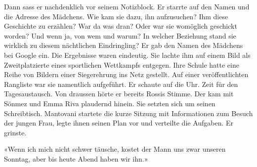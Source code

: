 Dann sass er nachdenklich vor seinem Notizblock. Er starrte auf den Namen
und die Adresse des Mädchens. 
Wie kam sie dazu, ihn aufzusuchen? Ihm diese Geschichte zu
erzählen? War da was dran? Oder war sie womöglich geschickt worden? Und
wenn ja, von wem und warum? In welcher Beziehung stand sie wirklich zu
diesem nächtlichen Eindringling? Er gab den Namen des Mädchens bei
Google ein. Die Ergebnisse waren eindeutig. Sie lachte ihm auf einem
Bild als Zweitplatzierte eines sportlichen Wettkampfs entgegen. Ihre Schule
hatte eine Reihe von Bildern einer Siegerehrung ins Netz gestellt. Auf
einer veröffentlichten Rangliste war sie namentlich aufgeführt.
Er schaute auf die Uhr. Zeit für den Tagesaustausch. Von draussen
hörte er bereits Rossis Stimme. Der kam  mit Sönmez und 
Emma Riva plaudernd hinein. Sie setzten sich um seinen Schreibtisch.
Mantovani startete die kurze Sitzung mit Informationen zum Besuch der jungen
Frau, legte ihnen seinen Plan vor und verteilte die Aufgaben. Er grinste.

«Wenn ich mich nicht schwer täusche, kostet der Mann uns zwar unseren Sonntag, aber bis heute Abend haben wir ihn.»








